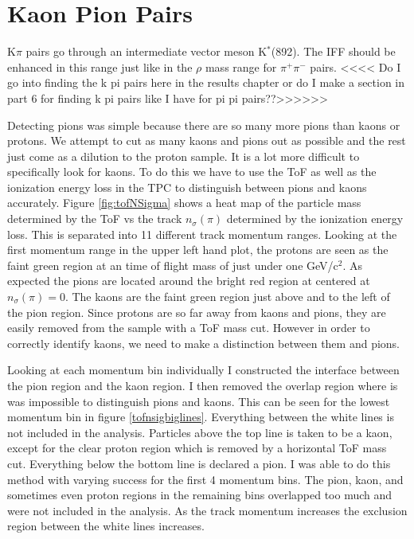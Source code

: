 \documentclass[abstract = on,listof=totoc, bibliography=totoc]{scrreprt}
\newcommand{\pip}{\pi^+}
\newcommand{\pim}{\pi^-}
\newcommand{\pair}{$\pip\pim$ }
\newcommand{\nsigpi}{n_\sigma(\pi)}
\begin{document}
\section{Kaon Pion Pairs}


K$\pi$ pairs go through an intermediate vector meson K$^*$(892). The IFF should be enhanced in this range just like in the $\rho$ mass range for \pair pairs. <<<< Do I go into finding the k pi pairs here in the results chapter or do I make a section in part 6 for finding k pi pairs like I have for pi pi pairs??>>>>>>




Detecting pions was simple because there are so many more pions than kaons or protons. We attempt to cut as many kaons and pions out as possible and the rest just come as a dilution to the proton sample. It is a lot more difficult to specifically look for kaons. To do this we have to use the ToF as well as the ionization energy loss in the TPC to distinguish between pions and kaons accurately. Figure \ref{fig:tofNSigma} shows a heat map of the particle mass determined by the ToF vs the track $\nsigpi$ determined by the ionization energy loss. This is separated into 11 different track momentum ranges. Looking at the first momentum range in the upper left hand plot, the protons are seen as the faint green region at an time of flight mass of just under one GeV/c$^2$. As expected the pions are located around the bright red region at centered at $\nsigpi = 0$. The kaons are the faint green region just above and to the left of the pion region. Since protons are so far away from kaons and pions, they are easily removed from the sample with a ToF mass cut. However in order to correctly identify kaons, we need to make a distinction between them and pions. 

Looking at each momentum bin individually I constructed the interface between the pion region and the kaon region. I then removed the overlap region where is was impossible to distinguish pions and kaons. This can be seen for the lowest momentum bin in figure \ref{tofnsigbiglines}. Everything between the white lines is not included in the analysis. Particles above the top line is taken to be a kaon, except for the clear proton region which is removed by a horizontal ToF mass cut. Everything below the bottom line is declared a pion. I was able to do this method with varying success for the first 4 momentum bins. The pion, kaon, and sometimes even proton regions in the remaining bins overlapped too much and were not included in the analysis. As the track momentum increases the exclusion region between the white lines increases.    
\end{document}
